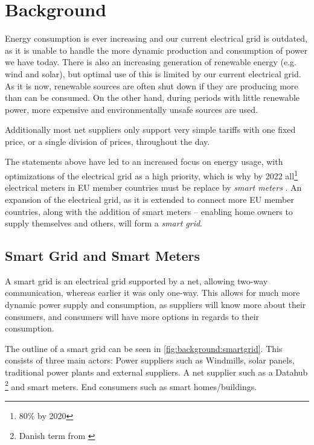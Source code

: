 \section{Background}
Energy consumption is ever increasing and our current electrical grid is outdated, as it is unable to handle the more dynamic production and consumption of power we have today.
There is also an increasing generation of renewable energy (e.g. wind and solar), but optimal use of this is limited by our current electrical grid.
As it is now, renewable sources are often shut down if they are producing more than can be consumed.
On the other hand, during periods with little renewable power, more expensive and environmentally unsafe sources are used.

Additionally most net suppliers only support very simple tariffs with one fixed price, or a single division of prices, throughout the day.

The statements above have led to an increased focus on energy usage, with optimizations of the electrical grid as a high priority, which is why by 2022 all\footnote{80\% by 2020} electrical meters in EU member countries must be replace by \textit{smart meters} \cite{smart_meter_survey, directive_2009_72_EC}.
An expansion of the electrical grid, as it is extended to connect more EU member countries, along with the addition of smart meters -- enabling home owners to supply themselves and others, will form a \textit{smart grid}.

\subsection{Smart Grid and Smart Meters}
A smart grid is an electrical grid supported by a net, allowing two-way communication, whereas earlier it was only one-way.
This allows for much more dynamic power supply and consumption, as suppliers will know more about their consumers, and consumers will have more options in regards to their consumption.

The outline of a smart grid can be seen in \cref{fig:background:smartgrid}.
This consists of three main actors:
Power suppliers such as Windmills, solar panels, traditional power plants and external suppliers.
A net supplier such as a Datahub \footnote{Danish term from \cite{LOV_nr_575_af_18-06-2012}} and smart meters.
End consumers such as smart homes/buildings.

